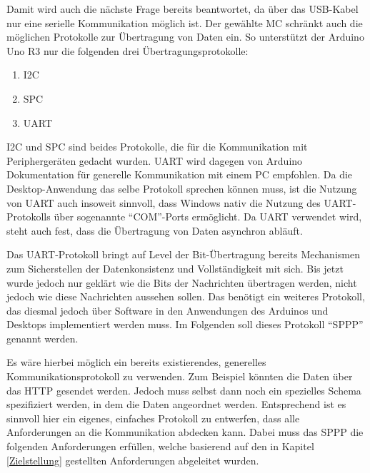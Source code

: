 Damit wird auch die nächste Frage bereits beantwortet, da über das USB-Kabel nur eine serielle Kommunikation möglich ist.
Der gewählte \ac{MC} schränkt auch die möglichen Protokolle zur Übertragung von Daten ein.
So unterstützt der Arduino Uno R3 nur die folgenden drei Übertragungsprotokolle:
\begin{enumerate}
    \item \ac{I2C}
    \item \ac{SPC}
    \item \ac{UART}
\end{enumerate}
\ac{I2C} und \ac{SPC} sind beides Protokolle, die für die Kommunikation mit Periphergeräten gedacht wurden.
\ac{UART} wird dagegen von Arduino Dokumentation für generelle Kommunikation mit einem PC empfohlen. %
Da die Desktop-Anwendung das selbe Protokoll sprechen können muss, ist die Nutzung von \ac{UART} auch insoweit sinnvoll, dass Windows nativ die Nutzung des \ac{UART}-Protokolls über sogenannte \enquote{COM}-Ports ermöglicht.
Da \ac{UART} verwendet wird, steht auch fest, dass die Übertragung von Daten asynchron abläuft.

Das \ac{UART}-Protokoll bringt auf Level der Bit-Übertragung bereits Mechanismen zum Sicherstellen der Datenkonsistenz und Vollständigkeit mit sich. %
Bis jetzt wurde jedoch nur geklärt wie die Bits der Nachrichten übertragen werden, nicht jedoch wie diese Nachrichten aussehen sollen.
Das benötigt ein weiteres Protokoll, das diesmal jedoch über Software in den Anwendungen des Arduinos und Desktops implementiert werden muss.
Im Folgenden soll dieses Protokoll \enquote{\ac{SPPP}} genannt werden.

Es wäre hierbei möglich ein bereits existierendes, generelles Kommunikationsprotokoll zu verwenden.
Zum Beispiel könnten die Daten über das \ac{HTTP} gesendet werden.
Jedoch muss selbst dann noch ein spezielles Schema spezifiziert werden, in dem die Daten angeordnet werden.
Entsprechend ist es sinnvoll hier ein eigenes, einfaches Protokoll zu entwerfen, dass alle Anforderungen an die Kommunikation abdecken kann.
Dabei muss das \ac{SPPP} die folgenden Anforderungen erfüllen, welche basierend auf den in Kapitel \ref{Zielstellung} gestellten Anforderungen abgeleitet wurden.

